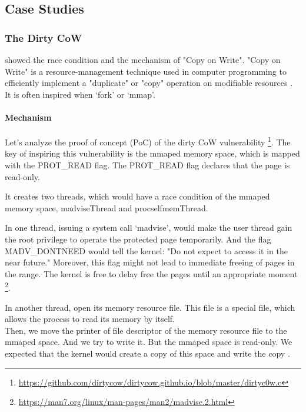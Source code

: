 \subsection{Case Studies}
\label{k_case}

\subsubsection{The Dirty CoW}
\textcite{8019988} showed the race condition and the mechanism of "Copy on
Write". "Copy on Write" is a resource-management technique used in computer programming
to efficiently implement a "duplicate" or "copy" operation on modifiable resources \cite{6394426}.
It is often inspired when `fork' or `mmap'.

\paragraph{Mechanism}
Let's analyze the proof of concept (PoC) of the dirty CoW \cite{8019988} vulnerability
\footnote{\url{https://github.com/dirtycow/dirtycow.github.io/blob/master/dirtyc0w.c}}.
The key of inspiring this vulnerability is the mmaped memory space, which is mapped with
the PROT\_READ flag. The PROT\_READ flag declares that the page is read-only.


It creates two threads, which would have a race condition of the mmaped memory space,
madviseThread and procselfmemThread.



In one thread, issuing a system call `madvise', would make the user thread gain the root
privilege to operate the protected page temporarily. And the flag MADV\_DONTNEED would
tell the kernel: "Do not expect to access it in the near future." Moreover,
this flag might not lead to immediate freeing of pages in the range. The kernel is free
to delay free the pages until an appropriate moment \footnote{\url{https://man7.org/linux/man-pages/man2/madvise.2.html}}.



In another thread, open its memory resource file. This file is a special file, which allows
the process to read its memory by itself.\\

Then, we move the printer of file descriptor of the memory resource file to the mmaped
space. And we try to write it. But the mmaped space is read-only. We expected that the
kernel would create a copy of this space and write the copy \cite{8001953}.\\


